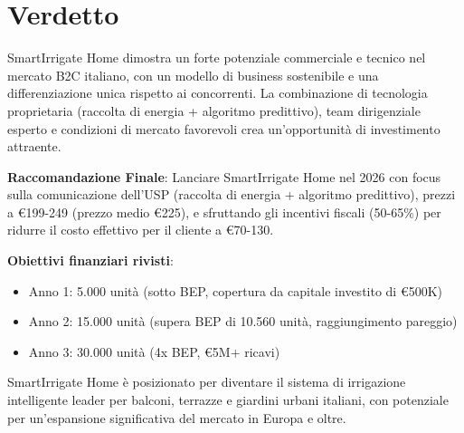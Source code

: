 \documentclass[11pt,a4paper]{report}
\begin{document}
\section{Verdetto}
SmartIrrigate Home dimostra un forte potenziale commerciale e tecnico nel mercato B2C italiano, con un modello di business sostenibile e una differenziazione unica rispetto ai concorrenti. La combinazione di tecnologia proprietaria (raccolta di energia + algoritmo predittivo), team dirigenziale esperto e condizioni di mercato favorevoli crea un'opportunità di investimento attraente.

\textbf{Raccomandazione Finale}: Lanciare SmartIrrigate Home nel 2026 con focus sulla comunicazione dell'USP (raccolta di energia + algoritmo predittivo), prezzi a €199-249 (prezzo medio €225), e sfruttando gli incentivi fiscali (50-65\%) per ridurre il costo effettivo per il cliente a €70-130. 

\textbf{Obiettivi finanziari rivisti}:
\begin{itemize}
    \item Anno 1: 5.000 unità (sotto BEP, copertura da capitale investito di €500K)
    \item Anno 2: 15.000 unità (supera BEP di 10.560 unità, raggiungimento pareggio)
    \item Anno 3: 30.000 unità (4x BEP, €5M+ ricavi)
\end{itemize}

SmartIrrigate Home è posizionato per diventare il sistema di irrigazione intelligente leader per balconi, terrazze e giardini urbani italiani, con potenziale per un'espansione significativa del mercato in Europa e oltre.
\end{document}
